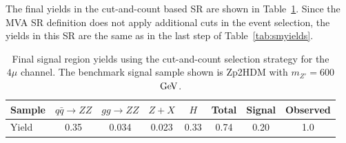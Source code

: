 \begin{table}[htbH]
\begin{center}
\caption{Cutflow table for the $4\mu$ channel. The benchmark signal sample shown is Zp2HDM with $m_{Z'}=600$ $\GeV$.}\label{tab:smyields}
\end{center}
\end{table}

The final yields in the cut-and-count based SR are shown in Table~\ref{tab:cacyields}. Since the MVA SR definition does not apply additional cuts in the event selection, the yields in this SR are the same as in the last step of Table~\ref{tab:smyields}.

\begin{table}[htbH]
\begin{center}
\begin{tabular}{ l | c | c | c | c | c | c | c }
\hline
\hline
Sample & $q\bar{q} \rightarrow ZZ$ & $gg \rightarrow ZZ$ & $Z+X$ & $H$ & Total & Signal & Observed \\
\hline
Yield & 0.35 & 0.034 & 0.023 & 0.33 & 0.74 & 0.20 & 1.0 \\
\hline
\hline
\end{tabular}
\caption{Final signal region yields using the cut-and-count selection strategy for the $4\mu$ channel. The benchmark signal sample shown is Zp2HDM with $m_{Z'}=600$ $\GeV$.}\label{tab:cacyields}
\end{center}
\end{table}



